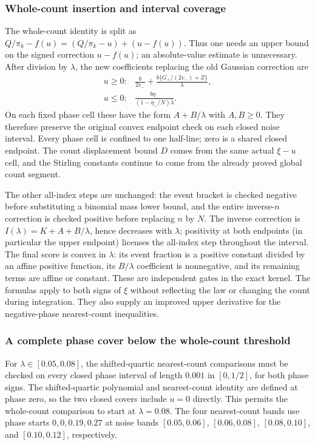 \subsubsection{Whole-count insertion and interval coverage}
The whole-count identity is split as
$Q/\pi_k-f(u)=(Q/\pi_k-u)+(u-f(u))$.
Thus one needs an upper bound on the signed correction $u-f(u)$;
an absolute-value estimate is unnecessary. After division by $\lambda$,
the new coefficients replacing the old Gaussian correction are
\[
 \begin{array}{ll}
 u\ge0:&\displaystyle
 \frac b{2v_-}+\frac{b\{G_+/(2v_-)+Z\}}\lambda,\\[6pt]
 u\le0:&\displaystyle
 \frac{b\eta_-}{(1-\eta_-/N)\lambda}.
 \end{array}
\]
On each fixed phase cell these have the form $A+B/\lambda$ with
$A,B\ge0$. They therefore preserve the original convex endpoint check on
each closed noise interval. Every phase cell is confined to one half-line;
zero is a shared closed endpoint. The count displacement bound $D$ comes
from the same actual $\xi-u$ cell, and the Stirling constants continue to
come from the already proved global count segment.

The other all-index steps are unchanged: the event bracket is checked
negative before substituting a binomial mass lower bound, and the entire
inverse-$n$ correction is checked positive before replacing $n$ by $N$.
The inverse correction is $I(\lambda)=K+A+B/\lambda$, hence decreases with $\lambda$; positivity at both endpoints (in particular the upper endpoint) licenses the all-index step throughout the interval. The final score is convex in $\lambda$: its event fraction is a positive constant divided by an affine positive function, its $B/\lambda$ coefficient is nonnegative, and its remaining terms are affine or constant. These are independent gates in the exact kernel. The formulas apply to
both signs of $\xi$ without reflecting the law or changing the count during
integration. They also supply an improved upper derivative for the
negative-phase nearest-count inequalities.
\subsubsection{A complete phase cover below the whole-count threshold}
For $\lambda\in[0.05,0.08]$, the shifted-quartic nearest-count comparisons
must be checked on every closed phase interval of length $0.001$ in
$[0,1/2]$, for both phase signs. The shifted-quartic polynomial and
nearest-count identity are defined at phase zero, so the two closed covers
include $u=0$ directly. This permits the whole-count comparison to
start at $\lambda=0.08$. The four nearest-count bands use phase starts
$0,0,0.19,0.27$ at noise bands $[0.05,0.06]$, $[0.06,0.08]$,
$[0.08,0.10]$, and $[0.10,0.12]$, respectively.

